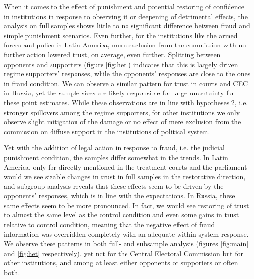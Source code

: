 \documentclass[11pt, ngerman,english,a4]{article}
\begin{document}
When it comes to the effect of punishment and potential restoring of confidence in institutions in response to observing it or deepening of detrimental effects, the analysis on full samples shows little to no significant difference between fraud and simple punishment scenarios. 
Even further, for the institutions like the armed forces and police in Latin America, mere exclusion from the commission with no further action lowered trust, on average, even further. Splitting between opponents and supporters (figure \ref{fig:het}) indicates that this is largely driven regime supporters' responses, while the opponents' responses are close to the ones in fraud condition. We can observe a similar pattern for trust in courts and CEC in Russia, yet the sample sizes are likely responsible for large uncertainty for these point estimates. While these observations are in line with hypotheses 2, i.e. stronger spillovers among the regime supporters, for other institutions we only observe slight mitigation of the damage or no effect of mere exclusion from the commission on diffuse support in the institutions of political system.

Yet with the addition of legal action in response to fraud, i.e. the judicial punishment condition, the samples differ somewhat in the trends.
In Latin America, only for directly mentioned in the treatment courts and the parliament would we see sizable changes in trust in full samples in the restorative direction, and subgroup analysis reveals that these effects seem to be driven by the opponents' responses, which is in line with the expectations.  
In Russia, these same effects seem to be more pronounced.
In fact, we would see restoring of trust to almost the same level as the control condition and even some gains in trust relative to control condition, meaning that the negative effect of fraud information was overridden completely with an adequate within-system response. We observe these patterns in both full- and subsample analysis (figures \ref{fig:main} and \ref{fig:het} respectively), yet not for the Central Electoral Commission but for other institutions, and among at least either opponents or supporters or often both. 
\end{document}
